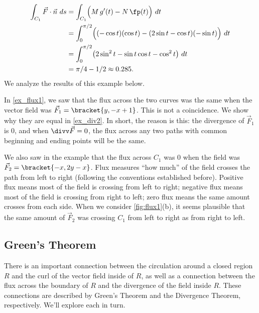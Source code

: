\begin{example}
\begin{align*}
	\int_{C_1} \vec F\cdot \vec n\ ds
	& = \int_{C_1} \Bigl(M\,g'(t) - N\,\fp(t)\Bigr)\ dt\\
	&= \int_0^{\pi/2}\Bigl((-\cos t)(\cos t) - (2\sin t-\cos t)(-\sin t)\Bigr)\ dt\\
	&= \int_0^{\pi/2} \bigl(2\sin^2 t-\sin t\cos t-\cos^2t\bigr)\ dt\\
	&=\pi/4 - 1/2\approx 0.285.
\end{align*}
We analyze the results of this example below.
\end{example}

In \autoref{ex_flux1}, we saw that the flux across the two curves was the same when the vector field was $\vec F_1 =\bracket{y, -x+1}$. This is not a coincidence. We show why they are equal in \autoref{ex_div2}. In short, the reason is this: the divergence of $\vec F_1$ is 0, and when $\divv \vec F = 0$, the flux across any two paths with common beginning and ending points will be the same.

We also saw in the example that the flux across $C_1$ was 0 when the field was $\vec F_2 =\bracket{-x, 2y-x}$. Flux measures ``how much'' of the field crosses the path from left to right (following the conventions established before). Positive flux means most of the field is crossing from left to right; negative flux means most of the field is crossing from right to left; zero flux means the same amount crosses from each side. When we consider \autoref{fig:flux1}(b), it seems plausible that the same amount of $\vec F_2$ was crossing $C_1$ from left to right as from right to left.

%

\subsection{Green's Theorem}

There is an important connection between the circulation around a closed region $R$ and the curl of the vector field inside of $R$, as well as a connection between the flux across the boundary of $R$ and the divergence of the field inside $R$. These connections are described by Green's Theorem and the Divergence Theorem, respectively. We'll explore each in turn.

